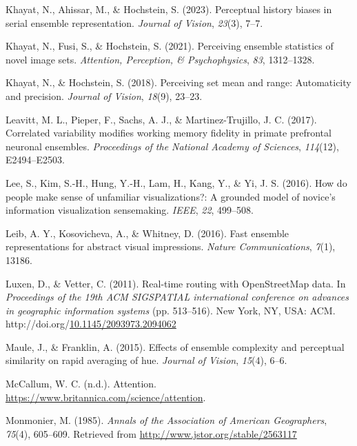 \documentclass[print]{nuthesis}
\newlength{\cslhangindent}
\newenvironment{CSLReferences}[2]%
{\setlength{\parindent}{0pt}%
\everypar{\setlength{\hangindent}{\cslhangindent}}\ignorespaces}%
{\par}
\begin{document}
\begin{CSLReferences}{1}{0}
\leavevmode{}%
Khayat, N., Ahissar, M., \& Hochstein, S. (2023). Perceptual history biases in serial ensemble representation. \emph{Journal of Vision}, \emph{23}(3), 7--7.

\leavevmode{}%
Khayat, N., Fusi, S., \& Hochstein, S. (2021). Perceiving ensemble statistics of novel image sets. \emph{Attention, Perception, \& Psychophysics}, \emph{83}, 1312--1328.

\leavevmode{}%
Khayat, N., \& Hochstein, S. (2018). Perceiving set mean and range: Automaticity and precision. \emph{Journal of Vision}, \emph{18}(9), 23--23.

\leavevmode{}%
Leavitt, M. L., Pieper, F., Sachs, A. J., \& Martinez-Trujillo, J. C. (2017). Correlated variability modifies working memory fidelity in primate prefrontal neuronal ensembles. \emph{Proceedings of the National Academy of Sciences}, \emph{114}(12), E2494--E2503.

\leavevmode{}%
Lee, S., Kim, S.-H., Hung, Y.-H., Lam, H., Kang, Y., \& Yi, J. S. (2016). How do people make sense of unfamiliar visualizations?: A grounded model of novice's information visualization sensemaking. \emph{IEEE}, \emph{22}, 499--508.

\leavevmode{}%
Leib, A. Y., Kosovicheva, A., \& Whitney, D. (2016). Fast ensemble representations for abstract visual impressions. \emph{Nature Communications}, \emph{7}(1), 13186.

\leavevmode{}%
Luxen, D., \& Vetter, C. (2011). Real-time routing with OpenStreetMap data. In \emph{Proceedings of the 19th ACM SIGSPATIAL international conference on advances in geographic information systems} (pp. 513--516). New York, NY, USA: ACM. http://doi.org/\href{https://doi.org/10.1145/2093973.2094062}{10.1145/2093973.2094062}

\leavevmode{}%
Maule, J., \& Franklin, A. (2015). Effects of ensemble complexity and perceptual similarity on rapid averaging of hue. \emph{Journal of Vision}, \emph{15}(4), 6--6.

\leavevmode{}%
McCallum, W. C. (n.d.). Attention. \url{https://www.britannica.com/science/attention}.

\leavevmode{}%
Monmonier, M. (1985). \emph{Annals of the Association of American Geographers}, \emph{75}(4), 605--609. Retrieved from \url{http://www.jstor.org/stable/2563117}


\end{CSLReferences}
\end{document}

